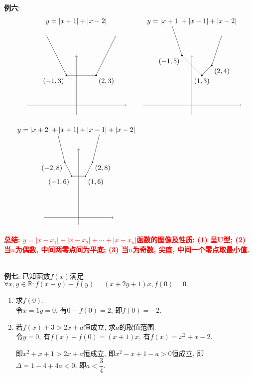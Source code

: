 \documentclass[8pt]{article}
\begin{document}
				\textbf{例六}: 
					$$
					\begin{array}{cc}
					y=|x+1|+|x-2|&y=|x+1|+|x-1|+|x-2|\\
					\begin{tikzpicture}[scale=0.5]
			    		\draw[black, ->] (-5,  0)--( 5,  0);
			    		\draw[black, ->] ( 0, -1)--( 0,  5);
			    		\draw[black] (-3, 7)--(-1, 3)--(2, 3)--(4, 7);
						\filldraw[black] (-1, 3) circle (2pt) node[anchor=north east] {$(-1, 3)$};
						\filldraw[black] ( 2,  3) circle (2pt) node[anchor=north west] {$(2, 3)$};
			    	\end{tikzpicture}
			    	&
			    	\begin{tikzpicture}[scale=0.5]
			    		\draw[black, ->] (-5,  0)--( 5,  0);
			    		\draw[black, ->] ( 0, -1)--( 0,  5);
			    		\draw[black] (-2, 8)--(-1, 5)--(1, 3)--(2, 4)--(3, 7);
						\filldraw[black] (-1, 5) circle (2pt) node[anchor=north east] {$(-1, 5)$};
						\filldraw[black] (1, 3) circle (2pt) node[anchor=north] {$(1, 3)$};
						\filldraw[black] (2, 4) circle (2pt) node[anchor=north west] {$(2, 4)$};
			    	\end{tikzpicture}
			    	\\\\
			    	y=|x+2|+|x+1|+|x-1|+|x-2|&\\
			    	\begin{tikzpicture}[scale=0.35]
			    		\draw[black, ->] (-5,  0)--( 5,  0);
			    		\draw[black, ->] ( 0, -1)--( 0,  10);
			    		\draw[black] (-3, 12)--(-2, 8)--(-1, 6)--(1, 6)--(2, 8)--(3, 12);
						\filldraw[black] (-2, 8) circle (2pt) node[anchor=north east] {$(-2, 8)$};
						\filldraw[black] (-1, 6) circle (2pt) node[anchor=north east] {$(-1, 6)$};
						\filldraw[black] (1, 6) circle (2pt) node[anchor=north west] {$(1, 6)$};
						\filldraw[black] (2, 8) circle (2pt) node[anchor=north west] {$(2, 8)$};
			    	\end{tikzpicture}
			    	&
			    	\end{array}
					$$

					\textbf{\textcolor{red}{总结: $y=|x-x_1|+|x-x_2|+\cdots+|x-x_n|$函数的图像及性质: (1) 呈U型; (2) 当$n$为偶数, 中间两零点间为平底; (3) 当$n$为奇数, 尖底, 中间一个零点取最小值.}}

				~\\

				\textbf{例七}: 已知函数$f(x)$满足$\forall x, y\in\mathbb{R}: f(x+y)-f(y)=(x+2y+1)x, f(0)=0.$
					\begin{enumerate}[label=(\arabic*)]
						\item 求$f(0)$.
							~\\

							令$x=1 y=0$, 有$0-f(0)=2$, 即$f(0)=-2$.
							~\\

						\item 若$f(x)+3>2x+a$恒成立, 求$a$的取值范围.
							~\\

							令$y=0$, 有$f(x)-f(0)=(x+1)x$, 有$f(x)=x^2+x-2$.

							即$x^2+x+1>2x+a$恒成立, 即$x^2-x+1-a>0$恒成立, 即$\Delta=1-4+4a<0$, 即$a<\dfrac{3}{4}.$

					\end{enumerate}
\end{document}
